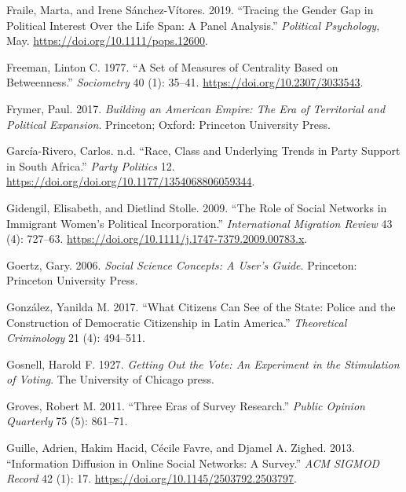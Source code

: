 \documentclass{book}
\newlength{\cslhangindent}
\newlength{\cslentryspacingunit} %
\newenvironment{CSLReferences}[2] %
 {%
  \setlength{\parindent}{0pt}
  \ifodd #1
  \let\oldpar\par
  \def\par{\hangindent=\cslhangindent\oldpar}
  \fi
  \setlength{\parskip}{#2\cslentryspacingunit}
 }%
 {}
\begin{document}
\begin{CSLReferences}{1}{0}
\leavevmode{}%
Fraile, Marta, and Irene Sánchez-Vítores. 2019. {``Tracing the {Gender Gap} in
{Political Interest Over} the {Life Span}: {A Panel Analysis}.''}
\emph{Political Psychology}, May. \url{https://doi.org/10.1111/pops.12600}.

\leavevmode{}%
Freeman, Linton C. 1977. {``A Set of Measures of Centrality Based on
Betweenness.''} \emph{Sociometry} 40 (1): 35--41.
\url{https://doi.org/10.2307/3033543}.

\leavevmode{}%
Frymer, Paul. 2017. \emph{Building an American Empire: The Era of Territorial
and Political Expansion}. Princeton; Oxford: Princeton University Press.

\leavevmode{}%
García-Rivero, Carlos. n.d. {``Race, Class and Underlying Trends in Party
Support in South Africa.''} \emph{Party Politics} 12.
\url{https://doi.org/doi.org/10.1177/1354068806059344}.

\leavevmode{}%
Gidengil, Elisabeth, and Dietlind Stolle. 2009. {``The Role of Social Networks
in Immigrant Women's Political Incorporation.''} \emph{International Migration
Review} 43 (4): 727--63.
\url{https://doi.org/10.1111/j.1747-7379.2009.00783.x}.

\leavevmode{}%
Goertz, Gary. 2006. \emph{Social {Science Concepts}: {A User}'s {Guide}}.
{Princeton}: {Princeton University Press}.

\leavevmode{}%
González, Yanilda M. 2017. {``What Citizens Can See of the State: Police and
the Construction of Democratic Citizenship in Latin America.''}
\emph{Theoretical Criminology} 21 (4): 494--511.

\leavevmode{}%
Gosnell, Harold F. 1927. \emph{Getting Out the Vote: An Experiment in the
Stimulation of Voting}. The University of Chicago press.

\leavevmode{}%
Groves, Robert M. 2011. {``Three Eras of Survey Research.''} \emph{Public
Opinion Quarterly} 75 (5): 861--71.

\leavevmode{}%
Guille, Adrien, Hakim Hacid, Cécile Favre, and Djamel A. Zighed. 2013.
{``Information Diffusion in Online Social Networks: A Survey.''} \emph{{ACM}
{SIGMOD} Record} 42 (1): 17. \url{https://doi.org/10.1145/2503792.2503797}.


\end{CSLReferences}
\end{document}
